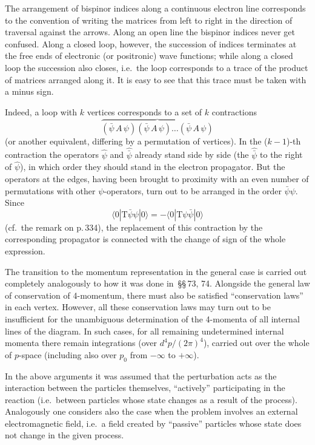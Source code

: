 The arrangement of bispinor indices along a continuous electron line corresponds to the convention of writing the matrices from left to right in the direction of traversal against the arrows. Along an open line the bispinor indices never get confused. Along a closed loop, however, the succession of indices terminates at the free ends of electronic (or positronic) wave functions; while along a closed loop the succession also closes, i.e.\ the loop corresponds to a trace of the product of matrices arranged along it. It is easy to see that this trace must be taken with a minus sign.

Indeed, a loop with $k$ vertices corresponds to a set of $k$ contractions
\[
\overbrace{(\bar{\psi}\,A\,\psi)(\bar{\psi}\,A\,\psi)\ldots(\bar{\psi}\,A\,\psi)}
\]
(or another equivalent, differing by a permutation of vertices). In the ($k-1$)-th contraction the operators $\hat{\psi}$ and $\hat{\bar{\psi}}$ already stand side by side (the $\hat{\bar{\psi}}$ to the right of $\hat{\psi}$), in which order they should stand in the electron propagator. But the operators at the edges, having been brought to proximity with an even number of permutations with other $\psi$-operators, turn out to be arranged in the order $\bar{\psi}\psi$. Since
\[
\langle 0|\mathrm{T}\bar{\psi}\psi|0\rangle = -\langle 0|\mathrm{T}\psi\bar{\psi}|0\rangle
\]
(cf.~the remark on p.\,334), the replacement of this contraction by the corresponding propagator is connected with the change of sign of the whole expression.

The transition to the momentum representation in the general case is carried out completely analogously to how it was done in~\S\S\,73, 74. Alongside the general law of conservation of 4-momentum, there must also be satisfied ``conservation laws'' in each vertex. However, all these conservation laws may turn out to be insufficient for the unambiguous determination of the 4-momenta of all internal lines of the diagram. In such cases, for all remaining undetermined internal momenta there remain integrations (over $d^4p/(2\pi)^4$), carried out over the whole of $p$-space (including also over $p_0$ from $-\infty$ to $+\infty$).

In the above arguments it was assumed that the perturbation acts as the interaction between the particles themselves, ``actively'' participating in the reaction (i.e.\ between particles whose state changes as a result of the process). Analogously one considers also the case when the problem involves an external electromagnetic field, i.e.\ a field created by ``passive'' particles whose state does not change in the given process.

